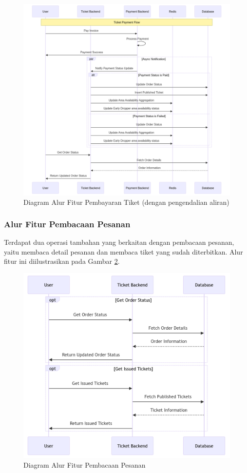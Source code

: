 \begin{figure}[H]
    \centering
    \includegraphics[width=1\textwidth]{resources/chapter-3/order-payment-fc.png}
    \caption{Diagram Alur Fitur Pembayaran Tiket (dengan pengendalian aliran)}
    \label{fig:flow-order-payment-fc}
\end{figure}

\pagebreak

\subsubsection{Alur Fitur Pembacaan Pesanan}

Terdapat dua operasi tambahan yang berkaitan dengan pembacaan pesanan, yaitu membaca detail pesanan dan membaca tiket yang sudah diterbitkan. Alur fitur ini diilustrasikan pada Gambar \ref{fig:flow-order-flow}.

\begin{figure}[H]
    \centering
    \includegraphics[width=1\textwidth]{resources/chapter-3/order-flow.png}
    \caption{Diagram Alur Fitur Pembacaan Pesanan}
    \label{fig:flow-order-flow}
\end{figure}